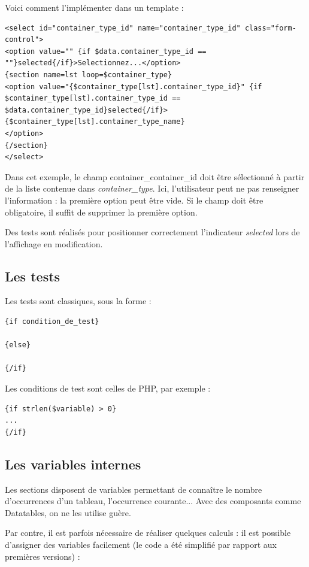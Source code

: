Voici comment l'implémenter dans un template :

\begin{lstlisting}
<select id="container_type_id" name="container_type_id" class="form-control">
<option value="" {if $data.container_type_id == ""}selected{/if}>Selectionnez...</option>
{section name=lst loop=$container_type}
<option value="{$container_type[lst].container_type_id}" {if $container_type[lst].container_type_id == $data.container_type_id}selected{/if}>
{$container_type[lst].container_type_name}
</option>
{/section}
</select>
\end{lstlisting}

Dans cet exemple, le champ container\_container\_id doit être sélectionné à partir de la liste contenue dans \textit{container\_type}. Ici, l'utilisateur peut ne pas renseigner l'information : la première option peut être vide. Si le champ doit être obligatoire, il suffit de supprimer la première option.

Des tests sont réalisés pour positionner correctement l'indicateur \textit{selected} lors de l'affichage en modification.

\subsection{Les tests}

Les tests sont classiques, sous la forme : 
\begin{lstlisting}
{if condition_de_test}

{else}

{/if}
\end{lstlisting}

Les conditions de test sont celles de PHP, par exemple :
\begin{lstlisting}
{if strlen($variable) > 0}
...
{/if}
\end{lstlisting}

\subsection{Les variables internes}
Les sections disposent de variables permettant de connaître le nombre d'occurrences d'un tableau, l'occurrence courante... Avec des composants comme Datatables, on ne les utilise guère.

Par contre, il est parfois nécessaire de réaliser quelques calculs : il est possible d'assigner des variables facilement (le code a été simplifié par rapport aux premières versions) :

